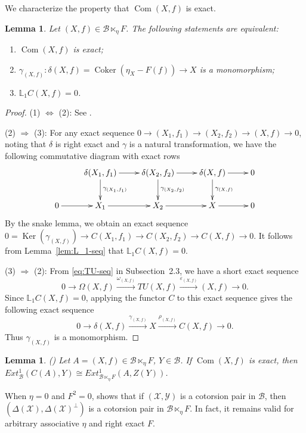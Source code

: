 \documentclass[11pt,reqno]{amsart}
\numberwithin{equation}{section}
\newtheorem{lemma}[theorem]{Lemma}
\newcommand{\cB}{\mathcal B}
\newcommand{\cX}{\mathcal X}
\newcommand{\cY}{\mathcal Y}
\newcommand{\Coker}{\operatorname{Coker}}
\newcommand{\Ker}{\operatorname{Ker}}
\newcommand{\Com}{\operatorname{Com}}
\begin{document}
We characterize the property that $\Com(X,f)$ is exact.

\begin{lemma}\label{lem:Com-ex}
Let $(X,f)\in \cB\ltimes_\eta F$. The following statements are equivalent:
\begin{enumerate}[label=\textup{(\arabic*)}]
\item $\Com(X,f)$ is exact;
\item $\gamma_{(X,f)}\colon \delta(X,f)=\Coker(\eta_X-F(f))\to X$ is a monomorphism;
\item $\mathbb{L}_1C(X,f)=0$.
\end{enumerate}
\end{lemma}
\begin{proof}
{\rm (1) $\Leftrightarrow$ (2):} See \cite[Lemma 3.2]{Hu}.

{\rm (2) $\Rightarrow$ (3):} For any exact sequence $0\rightarrow (X_1,f_1)\rightarrow (X_2,f_2)\rightarrow (X,f)\rightarrow 0$, noting that
$\delta$ is right exact and $\gamma$ is a natural transformation,
we have the following commutative diagram with
exact rows
\[
\xymatrix{
&\delta(X_1,f_1)\ar[r]\ar[d]^{\gamma_{(X_1,f_1)}} & \delta(X_2,f_2)\ar[r]\ar[d]^{\gamma_{(X_2,f_2)}} & \delta(X,f) \ar[r]\ar[d]^{\gamma_{(X,f)}} & 0\\
0 \ar[r] & X_1\ar[r] & X_2 \ar[r] & X \ar[r] & 0
}
\]
By the snake lemma, we obtain an exact sequence $0=\Ker(\gamma_{(X,f)})\rightarrow C(X_1,f_1)\rightarrow C(X_2,f_2)\rightarrow C(X,f)\rightarrow 0$. It follows from
Lemma~\ref{lem:L_1-seq} that $\mathbb{L}_1C(X,f)=0$.

{\rm (3) $\Rightarrow$ (2):} From \eqref{eq:TU-seq} in Subsection~2.3, we have a short exact sequence
\[
0\rightarrow \Omega(X,f) \xrightarrow{\omega_{(X,f)}} TU(X,f)\xrightarrow{\varepsilon_{(X,f)}} (X,f)\rightarrow 0.
\]
Since $\mathbb{L}_1C(X,f)=0$, applying the functor $C$ to this exact sequence gives the following exact sequence
\[
0\rightarrow \delta(X,f) \xrightarrow{\gamma_{(X,f)}} X\xrightarrow{\rho_{(X,f)}} C(X,f)\rightarrow 0.
\]
Thus $\gamma_{(X,f)}$ is a monomorphism.
\end{proof}

\begin{lemma}\label{lem:CZ-ext}
{\rm (\cite[Lemma~3.3]{Hu})}
Let $A=(X,f)\in \cB\ltimes_\eta F$, $Y\in \cB$. If $\Com(X,f)$ is exact, then $Ext^1_{\cB}(C(A),Y)\cong Ext_{\cB\ltimes_\eta F}^1(A,Z(Y))$.
\end{lemma}


When $\eta=0$ and $F^2=0$, \cite[Theorem 3.7]{Hu} shows that if $(\cX,\cY)$ is a cotorsion pair in $\cB$, then
$(\Delta(\cX),\Delta(\cX)^{\perp})$ is a cotorsion pair in $\cB\ltimes_\eta F$.
In fact, it remains valid for arbitrary associative $\eta$ and right exact $F$.
\end{document}

